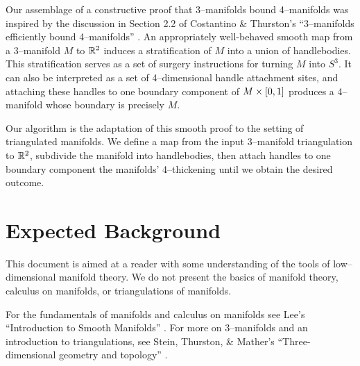 %

Our assemblage of a constructive proof that 3--manifolds bound 4--manifolds was inspired by the discussion in Section 2.2 of Costantino \& Thurston's ``3--manifolds efficiently bound 4--manifolds'' \cite{CostThur08}.
An appropriately well-behaved smooth map from a 3--manifold $M$ to $\mathbb{R}^2$ induces a stratification of $M$ into a union of handlebodies.
This stratification serves as a set of surgery instructions for turning $M$ into $S^3$.
It can also be interpreted as a set of 4--dimensional handle attachment sites, and attaching these handles to one boundary component of $M\times[0,1]$ produces a 4--manifold whose boundary is precisely $M$.

Our algorithm is the adaptation of this smooth proof to the setting of triangulated manifolds.
We define a map from the input 3--manifold triangulation to $\mathbb{R}^2$, subdivide the manifold into handlebodies, then attach handles to one boundary component the manifolds' 4--thickening until we obtain the desired outcome.

\section{Expected Background}

This document is aimed at a reader with some understanding of the tools of low--dimensional manifold theory.
We do not present the basics of manifold theory, calculus on manifolds, or triangulations of manifolds.

For the fundamentals of manifolds and calculus on manifolds see Lee's ``Introduction to Smooth Manifolds'' \cite{Lee00}.
For more on 3--manifolds and an introduction to triangulations, see Stein, Thurston, \& Mather's ``Three-dimensional geometry and topology'' \cite{thurston1979geometry}.


